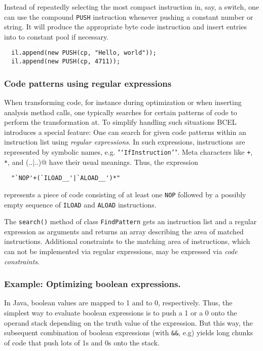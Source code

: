 \documentclass[12pt,twoside]{article}
\newcommand\jc{{\sffamily BCEL }}
\newcommand\cp{{constant pool }}
\begin{document}
Instead of repeatedly selecting  the most compact instruction in, say,
a switch, one can  use the compound \texttt{PUSH} instruction whenever
pushing a constant  number or string. It will  produce the appropriate
byte code instruction and insert entries into to \cp if necessary.

\begin{verbatim}
  il.append(new PUSH(cp, "Hello, world"));
  il.append(new PUSH(cp, 4711));
\end{verbatim}

\subsubsection{Code patterns using regular expressions}\label{sec:peephole}

When  transforming  code, for  instance  during  optimization or  when
inserting analysis  method calls,  one typically searches  for certain
patterns  of  code to  perform  the  transformation  at.  To  simplify
handling such situations \jc introduces a special feature: One can
search  for  given code  patterns  within  an  instruction list  using
\emph{regular  expressions}.   In  such expressions,  instructions  are
represented by symbolic names, e.g.  "\texttt{`IfInstruction'}".  Meta
characters  like  \verb|+|, \verb|*|,  and  \verb@(..|..)@ have  their
usual meanings. Thus, the expression

\begin{verbatim}
  "`NOP'+(`ILOAD__'|`ALOAD__')*"
\end{verbatim}

represents a  piece of  code consisting of  at least  one \texttt{NOP}
followed  by   a  possibly   empty  sequence  of   \texttt{ILOAD}  and
\texttt{ALOAD} instructions.

The  \texttt{search()} method  of class  \texttt{FindPattern}  gets an
instruction list and a regular  expression as arguments and returns an
array  describing   the  area  of   matched  instructions.  Additional
constraints to  the matching  area of instructions,  which can  not be
implemented via  regular expressions, may be  expressed via \emph{code
constraints}.

\subsubsection{Example: Optimizing boolean expressions.}

In Java, boolean  values are mapped to 1 and  to 0, respectively. Thus,
the simplest way to evaluate boolean expressions is to push a 1 or a 0
onto the operand stack depending on the truth value of the expression.
But this  way, the subsequent combination of  boolean expressions (with
\verb|&&|, e.g) yields  long chunks of code that push  lots of 1s and
0s onto the stack.
\end{document}
